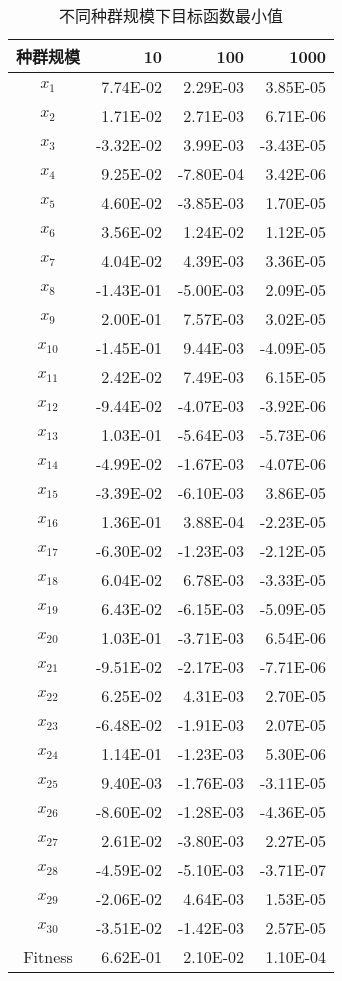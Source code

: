 \begin{table}[htbp]
	\centering
	\caption{不同种群规模下目标函数最小值}
	\begin{tabular}{crrr}
		\toprule[1.5pt]
		\label{tab2}
		\textbf{种群规模}  & \textbf{10}    & \textbf{100}   & \textbf{1000} \\
		\midrule[1pt]
		$ x_1 $    & 7.74E-02 & 2.29E-03 & 3.85E-05 \\
		$ x_2 $    & 1.71E-02 & 2.71E-03 & 6.71E-06 \\
		$ x_3 $    & -3.32E-02 & 3.99E-03 & -3.43E-05 \\
		$ x_4 $    & 9.25E-02 & -7.80E-04 & 3.42E-06 \\
		$ x_5 $    & 4.60E-02 & -3.85E-03 & 1.70E-05 \\
		$ x_6 $    & 3.56E-02 & 1.24E-02 & 1.12E-05 \\
		$ x_7 $    & 4.04E-02 & 4.39E-03 & 3.36E-05 \\
		$ x_8 $    & -1.43E-01 & -5.00E-03 & 2.09E-05 \\
		$ x_9 $    & 2.00E-01 & 7.57E-03 & 3.02E-05 \\
		$ x_{10} $   & -1.45E-01 & 9.44E-03 & -4.09E-05 \\
		$ x_{11} $   & 2.42E-02 & 7.49E-03 & 6.15E-05 \\
		$ x_{12} $   & -9.44E-02 & -4.07E-03 & -3.92E-06 \\
		$ x_{13} $   & 1.03E-01 & -5.64E-03 & -5.73E-06 \\
		$ x_{14} $   & -4.99E-02 & -1.67E-03 & -4.07E-06 \\
		$ x_{15} $   & -3.39E-02 & -6.10E-03 & 3.86E-05 \\
		$ x_{16} $   & 1.36E-01 & 3.88E-04 & -2.23E-05 \\
		$ x_{17} $   & -6.30E-02 & -1.23E-03 & -2.12E-05 \\
		$ x_{18} $   & 6.04E-02 & 6.78E-03 & -3.33E-05 \\
		$ x_{19} $   & 6.43E-02 & -6.15E-03 & -5.09E-05 \\
		$ x_{20} $   & 1.03E-01 & -3.71E-03 & 6.54E-06 \\
		$ x_{21} $   & -9.51E-02 & -2.17E-03 & -7.71E-06 \\
		$ x_{22} $   & 6.25E-02 & 4.31E-03 & 2.70E-05 \\
		$ x_{23} $   & -6.48E-02 & -1.91E-03 & 2.07E-05 \\
		$ x_{24} $   & 1.14E-01 & -1.23E-03 & 5.30E-06 \\
		$ x_{25} $   & 9.40E-03 & -1.76E-03 & -3.11E-05 \\
		$ x_{26} $   & -8.60E-02 & -1.28E-03 & -4.36E-05 \\
		$ x_{27} $   & 2.61E-02 & -3.80E-03 & 2.27E-05 \\
		$ x_{28} $   & -4.59E-02 & -5.10E-03 & -3.71E-07 \\
		$ x_{29} $   & -2.06E-02 & 4.64E-03 & 1.53E-05 \\
		$ x_{30} $   & -3.51E-02 & -1.42E-03 & 2.57E-05 \\
		\midrule[1pt]
		Fitness & 6.62E-01 & 2.10E-02 & 1.10E-04 \\
		\bottomrule[1.5pt]
	\end{tabular}%
	\label{tab:addlabel}%
\end{table}%

